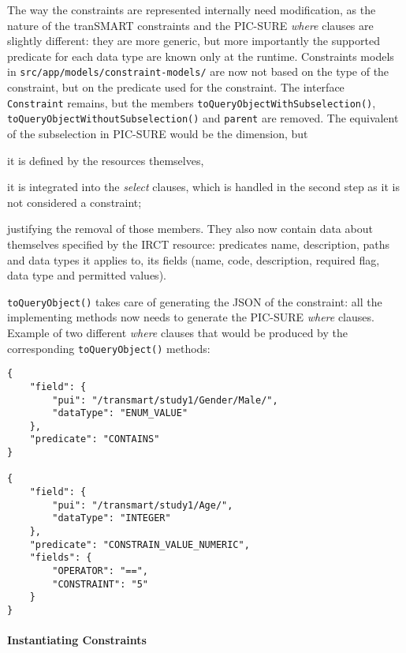 The way the constraints are represented internally need modification, as the nature of the tranSMART constraints and the PIC-SURE \emph{where} clauses are slightly different: they are more generic, but more importantly the supported predicate for each data type are known only at the runtime.
Constraints models in \verb|src/app/models/constraint-models/| are now not based on the type of the constraint, but on the predicate used for the constraint.
The interface \verb|Constraint| remains, but the members \verb|toQueryObjectWithSubselection()|, \verb|toQueryObjectWithoutSubselection()| and \verb|parent| are removed.
The equivalent of the subselection in PIC-SURE would be the dimension, but 
\begin{enumerate*}[label=(\arabic*)]
  \item it is defined by the resources themselves,
  \item it is integrated into the \emph{select} clauses, which is handled in the second step as it is not considered a constraint;
\end{enumerate*}
justifying the removal of those members.
They also now contain data about themselves specified by the IRCT resource: predicates name, description, paths and data types it applies to, its fields (name, code, description, required flag, data type and permitted values).

\verb|toQueryObject()| takes care of generating the JSON of the constraint: all the implementing methods now needs to generate the PIC-SURE \emph{where} clauses.
Example of two different \emph{where} clauses that would be produced by the corresponding \verb|toQueryObject()| methods:
\begin{verbatim}
{
    "field": {
        "pui": "/transmart/study1/Gender/Male/",
        "dataType": "ENUM_VALUE"
    },
    "predicate": "CONTAINS"
}

{
    "field": {
        "pui": "/transmart/study1/Age/",
        "dataType": "INTEGER"
    },
    "predicate": "CONSTRAIN_VALUE_NUMERIC",
    "fields": {
        "OPERATOR": "==",
        "CONSTRAINT": "5"
    }
}
\end{verbatim}


\paragraph{Instantiating Constraints}
\label{sec:gb-instanciating-constraints}

